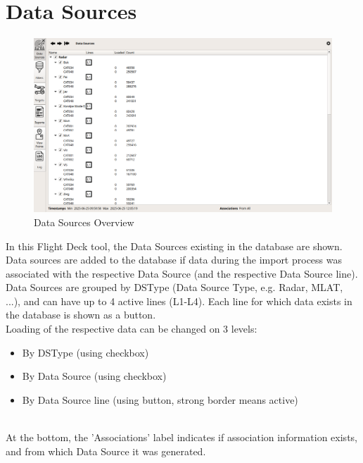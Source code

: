 \section{Data Sources}
\label{sec:data_sources}

\begin{figure}[H]
    \hspace*{-2.5cm}
    \includegraphics[width=19cm,frame]{figures/ui_data_sources.png}
  \caption{Data Sources Overview}
\end{figure}

In this Flight Deck tool, the Data Sources existing in the database are shown. 
Data sources are added to the database if data during the import process was associated with the respective Data Source (and the respective Data Source line). \\

Data Sources are grouped by DSType (Data Source Type, e.g. Radar, MLAT, ...), and can have up to 4 active lines (L1-L4). Each line for which data exists in the database is shown as a button. \\

Loading of the respective data can be changed on 3 levels:

\begin{itemize}
 \item By DSType (using checkbox)
 \item By Data Source (using checkbox)
 \item By Data Source line (using button, strong border means active)
\end{itemize}
\  \\

At the bottom, the 'Associations' label indicates if association information exists, and from which Data Source it was generated.\newline

